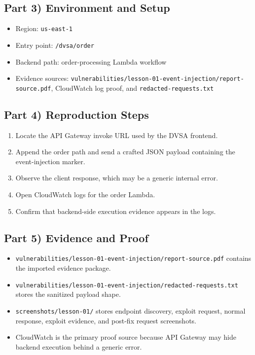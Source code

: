 \documentclass[12pt]{article}
\begin{document}
\subsection*{Part 3) Environment and Setup}
\begin{itemize}
\item Region: \texttt{us-east-1}
\item Entry point: \texttt{/dvsa/order}
\item Backend path: order-processing Lambda workflow
\item Evidence sources: \texttt{vulnerabilities/lesson-01-event-injection/report-source.pdf}, CloudWatch log proof, and \texttt{redacted-requests.txt}
\end{itemize}

\subsection*{Part 4) Reproduction Steps}
\begin{enumerate}
\item Locate the API Gateway invoke URL used by the DVSA frontend.
\item Append the order path and send a crafted JSON payload containing the event-injection marker.
\item Observe the client response, which may be a generic internal error.
\item Open CloudWatch logs for the order Lambda.
\item Confirm that backend-side execution evidence appears in the logs.
\end{enumerate}

\subsection*{Part 5) Evidence and Proof}
\begin{itemize}
\item \texttt{vulnerabilities/lesson-01-event-injection/report-source.pdf} contains the imported evidence package.
\item \texttt{vulnerabilities/lesson-01-event-injection/redacted-requests.txt} stores the sanitized payload shape.
\item \texttt{screenshots/lesson-01/} stores endpoint discovery, exploit request, normal response, exploit evidence, and post-fix request screenshots.
\item CloudWatch is the primary proof source because API Gateway may hide backend execution behind a generic error.
\end{itemize}
\end{document}
